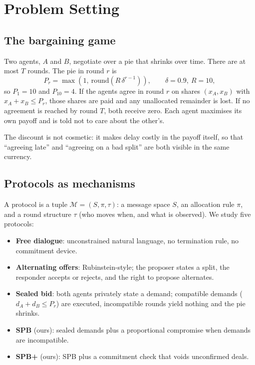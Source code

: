 \documentclass[11pt]{article}
\begin{document}
\section{Problem Setting}
\label{sec:problem}

\subsection{The bargaining game}

Two agents, $A$ and $B$, negotiate over a pie that shrinks over time. There are at most $T$ rounds. The pie in round $r$ is
\begin{equation}
P_r = \max\left(1,\ \mathrm{round}\left(R\,\delta^{r-1}\right)\right), \qquad \delta=0.9,\ R=10,
\end{equation}
so $P_1=10$ and $P_{10}=4$. If the agents agree in round $r$ on shares $(x_A,x_B)$ with $x_A+x_B\le P_r$, those shares are paid and any unallocated remainder is lost. If no agreement is reached by round $T$, both receive zero. Each agent maximises its own payoff and is told not to care about the other's.

The discount is not cosmetic: it makes delay costly in the payoff itself, so that ``agreeing late'' and ``agreeing on a bad split'' are both visible in the same currency.

\subsection{Protocols as mechanisms}

A protocol is a tuple $\mathcal{M}=(S,\pi,\tau)$: a message space $S$, an allocation rule $\pi$, and a round structure $\tau$ (who moves when, and what is observed). We study five protocols:
\begin{itemize}[leftmargin=*,itemsep=1pt]
\item \textbf{Free dialogue}: unconstrained natural language, no termination rule, no commitment device.
\item \textbf{Alternating offers}: Rubinstein-style; the proposer states a split, the responder accepts or rejects, and the right to propose alternates.
\item \textbf{Sealed bid}: both agents privately state a demand; compatible demands ($d_A+d_B\le P_r$) are executed, incompatible rounds yield nothing and the pie shrinks.
\item \textbf{SPB} (ours): sealed demands plus a proportional compromise when demands are incompatible.
\item \textbf{SPB+} (ours): SPB plus a commitment check that voids unconfirmed deals.
\end{itemize}
\end{document}
